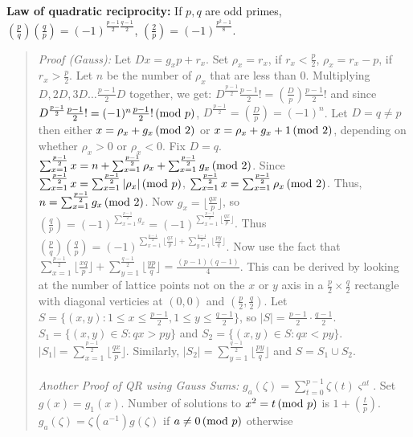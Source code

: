 {\bf Law of quadratic reciprocity:} If $p, q$ are odd primes,
$({\frac {p} {q}}) ({\frac {q} {p}})
= (-1)^{\frac {p-1} {2} \frac {q-1} {2}}$,
$({\frac {2} {p}}) = (-1)^{\frac {p^2 - 1} 8}$.
\begin{quote}
\emph{Proof (Gauss):} 
Let $Dx = g_x p + r_x$.  Set $\rho_x= r_x$, if $r_x < {\frac p 2}$,
$\rho_x= r_x-p$, if $r_x > {\frac p 2}$.  Let $n$ be the number
of $\rho_x$ that are less than $0$.  Multiplying $D, 2D, 3D \ldots
{\frac {p-1} 2} D$ together, we get:
$D^{\frac {p-1} 2} {\frac {p-1} 2}!= ({\frac D p}) {\frac {p-1} 2}!$
and since
$D^{\frac {p-1} 2} {\frac {p-1} 2}!= (-1)^n {\frac {p-1} 2}!\thinspace \textnormal{(mod } p \textnormal{)}$,
$D^{\frac {p-1} 2}= ({\frac D p})= (-1)^n$.  
Let $D=q \ne p$ then either $x= \rho_x + g_x \thinspace \textnormal{(mod } 2 \textnormal{)}$ or
$x= \rho_x + g_x +1 \thinspace \textnormal{(mod } 2 \textnormal{)}$, depending on whether $\rho_x>0$ or $\rho_x<0$.
Fix $D=q$. $\sum_{x=1}^{\frac {p-1} 2} x = n+ \sum_{x=1}^{\frac {p-1} 2} \rho_x +
\sum_{x=1}^{\frac {p-1} 2} g_x \thinspace \textnormal{(mod } 2 \textnormal{)}$.  Since 
$\sum_{x=1}^{\frac {p-1} 2} x =  \sum_{x=1}^{\frac {p-1} 2} |\rho_x| \thinspace \textnormal{(mod } p \textnormal{)}$,
$\sum_{x=1}^{\frac {p-1} 2} x =  \sum_{x=1}^{\frac {p-1} 2} \rho_x \thinspace \textnormal{(mod } 2 \textnormal{)}$.  Thus,
$n= \sum_{x=1}^{\frac {p-1} 2} g_x \thinspace \textnormal{(mod } 2 \textnormal{)}$.
Now $g_x= \lfloor {\frac {qx} p \rfloor}$,
so $({\frac q p})= (-1)^{\sum_{x=1}^{\frac {p-1} 2} g_x}=
(-1)^{\sum_{x=1}^{\frac {p-1} 2} \lfloor {\frac {qx} p} \rfloor}$.  Thus 
$({\frac p q}) ({\frac q p}) = 
(-1)^ {{\sum_{x=1}^{\frac {p-1}2} \lfloor {\frac {qx} p} \rfloor}
+ {\sum_{y=1}^{\frac {q-1} 2} \lfloor {\frac {py} q} \rfloor}}$.  
Now use the fact that
$\sum_{x=1}^{{\frac {p-1} 2}} \lfloor {\frac {xq} {p}} \rfloor +
\sum_{y=1}^{{\frac {q-1} 2}} \lfloor {\frac {yp} {q}} \rfloor =
{\frac {(p-1)(q-1)} 4}$.  This can be derived by looking at the number
of lattice points not on the $x$ or $y$ axis
in a ${\frac p 2} \times {\frac q 2}$ rectangle
with diagonal verticies at $(0, 0)$ and $({\frac p 2}, {\frac q 2})$.  
Let $S= \{ (x, y): 1 \leq x \leq {\frac {p-1} 2}, 1 \leq y \leq {\frac {q-1} 2} \}$,
so $|S|= {\frac {p-1} 2} \cdot {\frac {q-1} 2}$.  
$S_1= \{ (x,y) \in S: qx>py \}$ and
$S_2= \{ (x,y) \in S: qx<py \}$.  
$|S_1|= \sum_{x=1}^{\frac {p-1} 2} \lfloor {\frac {qx} p} \rfloor$.  Similarly,
$|S_2|= \sum_{y=1}^{\frac {q-1} 2} \lfloor {\frac {py} q} \rfloor$ and
$S= S_1 \cup S_2$.
\\
\\
\emph{Another Proof of QR using Gauss Sums:} $g_a (\zeta) = \sum_{t=0}^{p-1} \zeta(t)
\varsigma^{at}$.  Set $g(x)= g_1 (x)$.
Number of solutions to $x^2 = t \thinspace \textnormal{(mod } p \textnormal{)}$ is $1+({\frac t p})$.
$g_a(\zeta)= \zeta(a^{-1}) g(\zeta)$ if $a \ne 0 \thinspace \textnormal{(mod } p \textnormal{)}$ otherwise

\end{quote}
